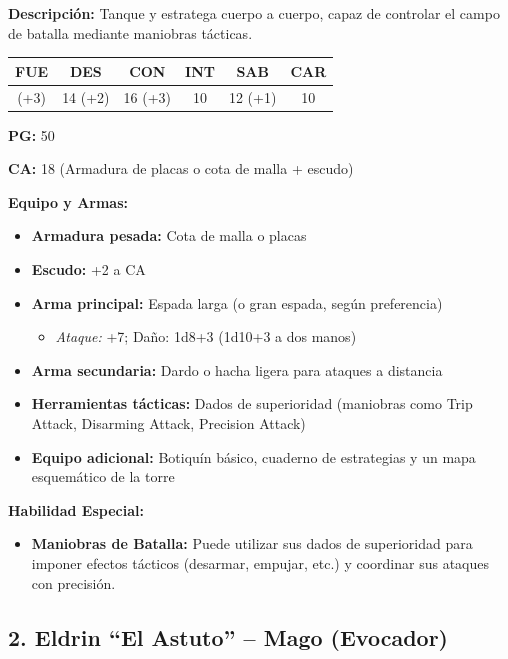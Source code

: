 \documentclass[
  twocolumn]{article}
\providecommand{\tightlist}{%
  \setlength{\itemsep}{0pt}\setlength{\parskip}{0pt}}
\begin{document}
\textbf{Descripción:} Tanque y estratega cuerpo a cuerpo, capaz de
controlar el campo de batalla mediante maniobras tácticas.

\begin{longtable}[]{@{}cccccc@{}}
\toprule\noalign{}
FUE & DES & CON & INT & SAB & CAR \\
\midrule\noalign{}
\endhead
\bottomrule\noalign{}
\endlastfoot
16 (+3) & 14 (+2) & 16 (+3) & 10 & 12 (+1) & 10 \\
\end{longtable}

\textbf{PG:} 50

\textbf{CA:} 18 (Armadura de placas o cota de malla + escudo)

\textbf{Equipo y Armas:}

\begin{itemize}
\tightlist
\item
  \textbf{Armadura pesada:} Cota de malla o placas
\item
  \textbf{Escudo:} +2 a CA
\item
  \textbf{Arma principal:} Espada larga (o gran espada, según
  preferencia)

  \begin{itemize}
  \tightlist
  \item
    \emph{Ataque:} +7; Daño: 1d8+3 (1d10+3 a dos manos)
  \end{itemize}
\item
  \textbf{Arma secundaria:} Dardo o hacha ligera para ataques a
  distancia
\item
  \textbf{Herramientas tácticas:} Dados de superioridad (maniobras como
  Trip Attack, Disarming Attack, Precision Attack)
\item
  \textbf{Equipo adicional:} Botiquín básico, cuaderno de estrategias y
  un mapa esquemático de la torre
\end{itemize}

\textbf{Habilidad Especial:}

\begin{itemize}
\tightlist
\item
  \textbf{Maniobras de Batalla:} Puede utilizar sus dados de
  superioridad para imponer efectos tácticos (desarmar, empujar, etc.) y
  coordinar sus ataques con precisión.
\end{itemize}

\subsection{2. Eldrin ``El Astuto'' -- Mago
(Evocador)}\label{eldrin-el-astuto-mago-evocador}
\end{document}
